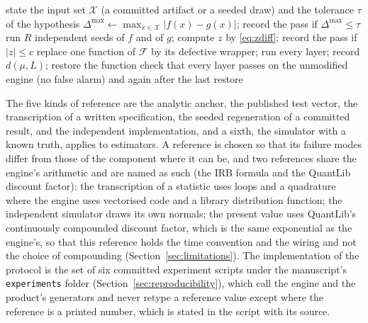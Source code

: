 \begin{algorithm}[htbp]
\caption{Reconcile a component of the engine to references outside it. The inputs are a component $f$, a list of references with their kind, and for each reference its input set, tolerance and seed; the output is a list of outcomes and a detection record for each planted defect.}
\label{alg:reconcile}
\begin{algorithmic}[1]
  \State state the input set $\mathcal{X}$ (a committed artifact or a seeded draw) and the tolerance $\tau$ of the hypothesis
    \State $\Delta^{\max}\gets\max_{x\in\mathcal{X}}|f(x)-g(x)|$; record the pass if $\Delta^{\max}\le\tau$
  \Else
    \State run $R$ independent seeds of $f$ and of $g$; compute $z$ by \eqref{eq:zdiff}; record the pass if $|z|\le c$
  \EndIf
\EndFor
{}
  \State replace one function of $\mathcal{F}$ by its defective wrapper; run every layer; record $d(\mu,L)$; restore the function
\EndFor
\State check that every layer passes on the unmodified engine (no false alarm) and again after the last restore
\end{algorithmic}
\end{algorithm}

The five kinds of reference are the analytic anchor, the published test vector, the transcription of a written specification, the seeded regeneration of a committed result, and the independent implementation, and a sixth, the simulator with a known truth, applies to estimators. A reference is chosen so that its failure modes differ from those of the component where it can be, and two references share the engine's arithmetic and are named as such (the IRB formula and the QuantLib discount factor): the transcription of a statistic uses loops and a quadrature where the engine uses vectorised code and a library distribution function; the independent simulator draws its own normals; the present value uses QuantLib's continuously compounded discount factor, which is the same exponential as the engine's, so that this reference holds the time convention and the wiring and not the choice of compounding (Section~\ref{sec:limitations}). The implementation of the protocol is the set of six committed experiment scripts under the manuscript's \texttt{experiments} folder (Section~\ref{sec:reproducibility}), which call the engine and the product's generators and never retype a reference value except where the reference is a printed number, which is stated in the script with its source.

